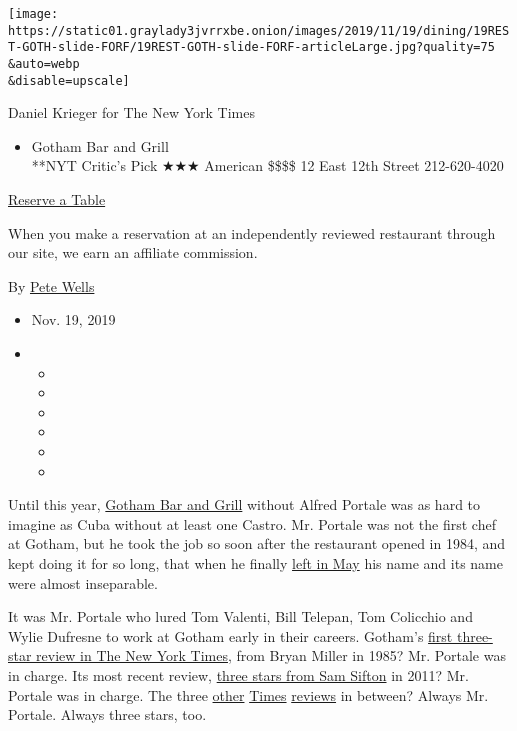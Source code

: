 \texttt{[image: https://static01.graylady3jvrrxbe.onion/images/2019/11/19/dining/19REST-GOTH-slide-FORF/19REST-GOTH-slide-FORF-articleLarge.jpg?quality=75\\\&auto=webp\\\&disable=upscale]}

Daniel Krieger for The New York Times

\begin{itemize}
\tightlist
\item
  Gotham Bar and Grill\\
  **NYT Critic's Pick ★★★ American \$\$\$\$ 12 East 12th Street
  212-620-4020
\end{itemize}

\href{https://resy.com/cities/ny/gotham-bar-and-grill?utm_source=nyt\&utm_medium=restoprofile\&utm_campaign=affiliates\&aff_id=c1fe784}{Reserve
a Table}

When you make a reservation at an independently reviewed restaurant
through our site, we earn an affiliate commission.

By \href{https://www.nytimes3xbfgragh.onion/by/pete-wells}{Pete Wells}

\begin{itemize}
\item
  Nov. 19, 2019
\item
  \begin{itemize}
  \item
  \item
  \item
  \item
  \item
  \item
  \end{itemize}
\end{itemize}

Until this year, \href{https://www.gothambarandgrill.com/}{Gotham Bar
and Grill} without Alfred Portale was as hard to imagine as Cuba without
at least one Castro. Mr. Portale was not the first chef at Gotham, but
he took the job so soon after the restaurant opened in 1984, and kept
doing it for so long, that when he finally
\href{https://www.nytimes3xbfgragh.onion/2019/09/03/dining/nyc-restaurants-marc-forgione-alfred-portale.html}{left
in May} his name and its name were almost inseparable.

It was Mr. Portale who lured Tom Valenti, Bill Telepan, Tom Colicchio
and Wylie Dufresne to work at Gotham early in their careers. Gotham's
\href{https://www.nytimes3xbfgragh.onion/1985/10/04/arts/resaturants.html}{first
three-star review in The New York Times}, from Bryan Miller in 1985? Mr.
Portale was in charge. Its most recent review,
\href{https://www.nytimes3xbfgragh.onion/2011/05/18/dining/reviews/gotham-bar-and-grill-nyc-restaurant-review.html}{three
stars from Sam Sifton} in 2011? Mr. Portale was in charge. The three
\href{https://www.nytimes3xbfgragh.onion/1989/09/29/arts/restaurants-260589.html}{other}
\href{https://www.nytimes3xbfgragh.onion/1993/08/27/arts/restaurants-011693.html}{Times}
\href{https://www.nytimes3xbfgragh.onion/1996/02/23/arts/restaurants-063177.html}{reviews}
in between? Always Mr. Portale. Always three stars, too.

